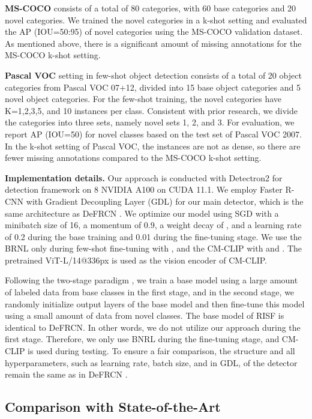 \documentclass{article}
\begin{document}
{\bf MS-COCO} consists of a total of 80 categories, with 60 base categories and 20 novel categories. We trained the novel categories in a k-shot setting and evaluated the AP (IOU=50:95) of novel categories using the MS-COCO validation dataset. 
As mentioned above, there is a significant amount of missing annotations for the MS-COCO k-shot setting.

{\bf Pascal VOC} setting in few-shot object detection consists of a total of 20 object categories from Pascal VOC 07+12, divided into 15 base object categories and 5 novel object categories. For the few-shot training, the novel categories have K=1,2,3,5, and 10 instances per class. Consistent with prior research, we divide the categories into three sets, namely novel sets 1, 2, and 3. For evaluation, we report AP (IOU=50) for novel classes based on the test set of Pascal VOC 2007.
In the k-shot setting of Pascal VOC, the instances are not as dense, so there are fewer missing annotations compared to the MS-COCO k-shot setting.

{\bf Implementation details.} Our approach is conducted with Detectron2 \cite{detectron2} for detection framework on 8 NVIDIA A100 on CUDA 11.1. 
We employ Faster R-CNN with Gradient Decoupling Layer (GDL) for our main detector, which is the same architecture as DeFRCN \cite{defrcn}. 
We optimize our model using SGD with a minibatch size of 16, a momentum of 0.9, a weight decay of , and a learning rate of 0.2 during the base training and 0.01 during the fine-tuning stage.
We use the BRNL only during few-shot fine-tuning with , and the CM-CLIP with  and . 
The pretrained ViT-L/14@336px is used as the vision encoder of CM-CLIP.

Following the two-stage paradigm \cite{tfa}, we train a base model using a large amount of labeled data from base classes in the first stage, and in the second stage, 
we randomly initialize output layers of the base model and then fine-tune this model using a small amount of data from novel classes.
The base model of RISF is identical to DeFRCN.
In other words, we do not utilize our approach during the first stage.
Therefore, we only use BNRL during the fine-tuning stage, and CM-CLIP is used during testing. 
To ensure a fair comparison, the structure and all hyperparameters, such as learning rate, batch size, and  in GDL, of the detector remain the same as in DeFRCN \cite{defrcn}.

\subsection{Comparison with State-of-the-Art}
\end{document}
